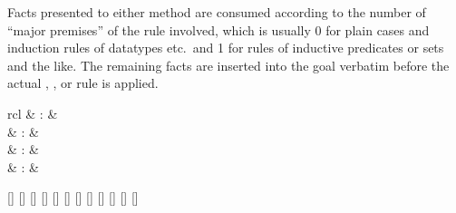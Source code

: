 \begin{isabellebody}
\begin{isamarkuptext}
  \medskip Facts presented to either method are consumed according to
  the number of ``major premises'' of the rule involved, which is
  usually 0 for plain cases and induction rules of datatypes etc.\ and
  1 for rules of inductive predicates or sets and the like.  The
  remaining facts are inserted into the goal verbatim before the
  actual , , or  rule is
  applied.%
\end{isamarkuptext}%
\isamarkuptrue%
%
\isamarkuptrue%
%
\begin{isamarkuptext}%
\begin{matharray}{rcl}
    \hypertarget{command.print-induct-rules}{\hyperlink{command.print-induct-rules}{\mbox{}}} & : &  \\
    \hypertarget{attribute.cases}{\hyperlink{attribute.cases}{\mbox{}}} & : &  \\
    \hypertarget{attribute.induct}{\hyperlink{attribute.induct}{\mbox{}}} & : &  \\
    \hypertarget{attribute.coinduct}{\hyperlink{attribute.coinduct}{\mbox{}}} & : &  \\
  \end{matharray}

  \begin{railoutput}
[]
[]
\rail@end
{}
[]
[]
\rail@end
{}
[]
[]
\rail@end
{}
\rail@bar
\rail@bar
{}[]
[]
[]
\rail@endbar
{}[]
[]
[]
\rail@endbar
\rail@end
\end{railoutput}



\end{isamarkuptext}
\end{isabellebody}
